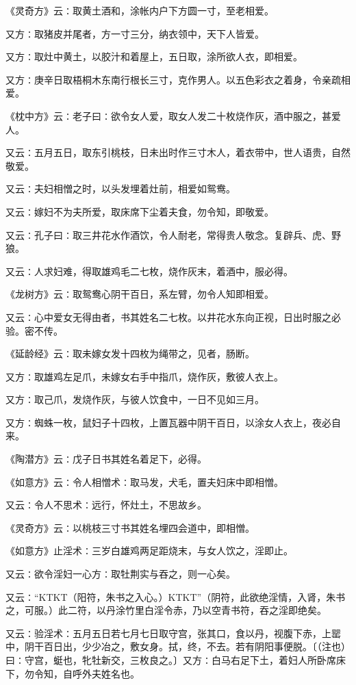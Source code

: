 \documentclass[a4paper,12pt,UTF8,twoside]{ctexbook}
\begin{document}
《灵奇方》云∶取黄土酒和，涂帐内户下方圆一寸，至老相爱。

又方∶取猪皮并尾者，方一寸三分，纳衣领中，天下人皆爱。

又方∶取灶中黄土，以胶汁和着屋上，五日取，涂所欲人衣，即相爱。

又方∶庚辛日取梧桐木东南行根长三寸，克作男人。以五色彩衣之着身，令亲疏相爱。

《枕中方》云∶老子曰∶欲令女人爱，取女人发二十枚烧作灰，酒中服之，甚爱人。

又云∶五月五日，取东引桃枝，日未出时作三寸木人，着衣带中，世人语贵，自然敬爱。

又云∶夫妇相憎之时，以头发埋着灶前，相爱如鸳鸯。

又云∶嫁妇不为夫所爱，取床席下尘着夫食，勿令知，即敬爱。

又云∶孔子曰∶取三井花水作酒饮，令人耐老，常得贵人敬念。复辟兵、虎、野狼。

又云∶人求妇难，得取雄鸡毛二七枚，烧作灰末，着酒中，服必得。

《龙树方》云∶取鸳鸯心阴干百日，系左臂，勿令人知即相爱。

又云∶心中爱女无得由者，书其姓名二七枚。以井花水东向正视，日出时服之必验。密不传。

《延龄经》云∶取未嫁女发十四枚为绳带之，见者，肠断。

又方∶取雄鸡左足爪，未嫁女右手中指爪，烧作灰，敷彼人衣上。

又方∶取己爪，发烧作灰，与彼人饮食中，一日不见如三月。

又方∶蜘蛛一枚，鼠妇子十四枚，上置瓦器中阴干百日，以涂女人衣上，夜必自来。

《陶潜方》云∶戊子日书其姓名着足下，必得。

《如意方》云∶令人相憎术∶取马发，犬毛，置夫妇床中即相憎。

又云∶令人不思术∶远行，怀灶土，不思故乡。

《灵奇方》云∶以桃枝三寸书其姓名埋四会道中，即相憎。

《如意方》止淫术∶三岁白雄鸡两足距烧末，与女人饮之，淫即止。

又云∶欲令淫妇一心方∶取牡荆实与吞之，则一心矣。

又云∶“KTKT（阳符，朱书之入心。）KTKT”（阴符，此欲绝淫情，入肾，朱书之，可服。）此二符，以丹涂竹里白淫令赤，乃以空青书符，吞之淫即绝矣。

又云∶验淫术∶五月五日若七月七日取守宫，张其口，食以丹，视腹下赤，上罂中，阴干百日出，少少冶之，敷女身。拭，终，不去。若有阴阳事便脱。〔（注也）曰∶守宫，蜓也，牝牡新交，三枚良之。〕又方∶白马右足下土，着妇人所卧席床下，勿令知，自呼外夫姓名也。
\end{document}
